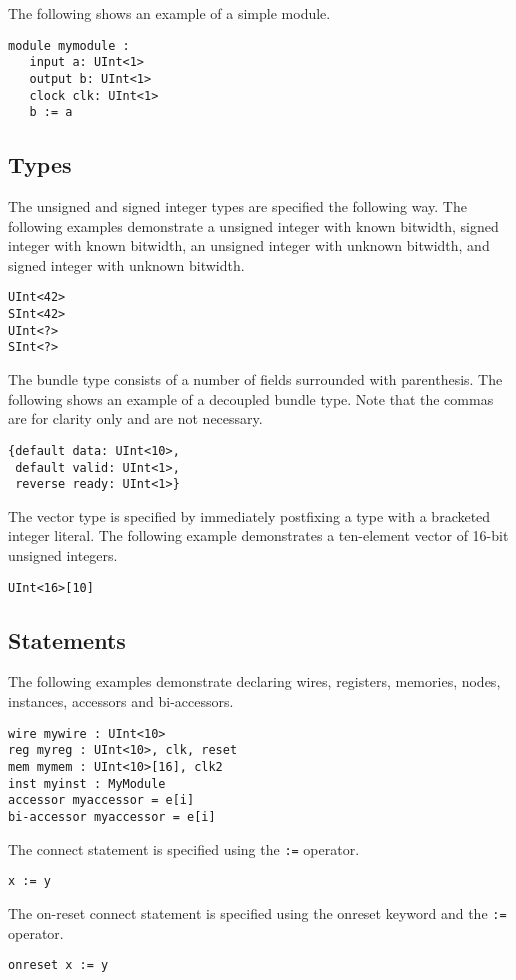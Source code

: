 \documentclass[10pt]{article}
\begin{document}
The following shows an example of a simple module.
\begin{verbatim}
module mymodule :
   input a: UInt<1>
   output b: UInt<1>
   clock clk: UInt<1>
   b := a
\end{verbatim}

\subsection*{Types}
The unsigned and signed integer types are specified the following way.
The following examples demonstrate a unsigned integer with known bitwidth, signed integer with known bitwidth, an unsigned integer with unknown bitwidth, and signed integer with unknown bitwidth.
\begin{verbatim}
UInt<42>
SInt<42>
UInt<?>
SInt<?>
\end{verbatim}

The bundle type consists of a number of fields surrounded with parenthesis.
The following shows an example of a decoupled bundle type.
Note that the commas are for clarity only and are not necessary.
\begin{verbatim}
{default data: UInt<10>,
 default valid: UInt<1>,
 reverse ready: UInt<1>} 
\end{verbatim}

The vector type is specified by immediately postfixing a type with a bracketed integer literal.
The following example demonstrates a ten-element vector of 16-bit unsigned integers.
\begin{verbatim}
UInt<16>[10]
\end{verbatim}

\subsection*{Statements}
The following examples demonstrate declaring wires, registers, memories, nodes, instances, accessors and bi-accessors. 
\begin{verbatim}
wire mywire : UInt<10>
reg myreg : UInt<10>, clk, reset
mem mymem : UInt<10>[16], clk2
inst myinst : MyModule
accessor myaccessor = e[i]
bi-accessor myaccessor = e[i]
\end{verbatim}

The connect statement is specified using the \verb|:=| operator.
\begin{verbatim}
x := y
\end{verbatim}

The on-reset connect statement is specified using the onreset keyword and the \verb|:=| operator.
\begin{verbatim}
onreset x := y
\end{verbatim}
\end{document}
